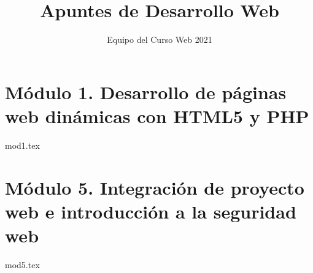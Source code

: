 \documentclass[12pt]{report}
\title{Apuntes de Desarrollo Web}
\author{Equipo del Curso Web 2021}
\begin{document}
	\maketitle
	\tableofcontents
	\chapter{Módulo 1. Desarrollo de páginas web dinámicas con HTML5 y PHP}
		{mod1.tex}
	\chapter{Módulo 5. Integración de proyecto web e introducción a la seguridad web}
		{mod5.tex}
\end{document}
